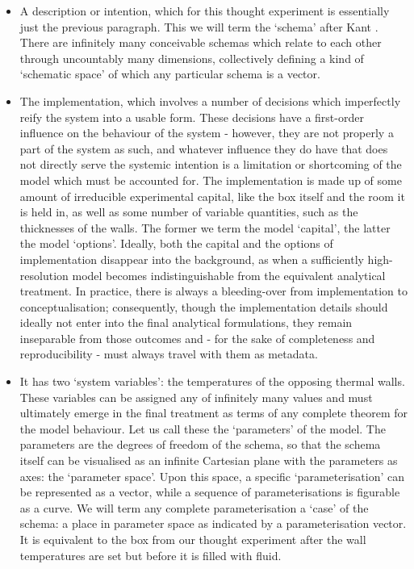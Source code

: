 \documentclass[a4paper,11pt,oneside]{book}
\begin{document}
\begin{itemize}
\item A description or intention, which for this thought experiment is essentially just the previous paragraph. This we will term the `schema' after Kant \cite{Kant1781-su}. There are infinitely many conceivable schemas which relate to each other through uncountably many dimensions, collectively defining a kind of `schematic space' of which any particular schema is a vector.


\item The implementation, which involves a number of decisions which imperfectly reify the system into a usable form. These decisions have a first-order influence on the behaviour of the system - however, they are not properly a part of the system as such, and whatever influence they do have that does not directly serve the systemic intention is a limitation or shortcoming of the model which must be accounted for. The implementation is made up of some amount of irreducible experimental capital, like the box itself and the room it is held in, as well as some number of variable quantities, such as the thicknesses of the walls. The former we term the model `capital', the latter the model `options'. Ideally, both the capital and the options of implementation disappear into the background, as when a sufficiently high-resolution model becomes indistinguishable from the equivalent analytical treatment. In practice, there is always a bleeding-over from implementation to conceptualisation; consequently, though the implementation details should ideally not enter into the final analytical formulations, they remain inseparable from those outcomes and - for the sake of completeness and reproducibility - must always travel with them as metadata.


\item It has two `system variables': the temperatures of the opposing thermal walls. These variables can be assigned any of infinitely many values and must ultimately emerge in the final treatment as terms of any complete theorem for the model behaviour. Let us call these the `parameters' of the model. The parameters are the degrees of freedom of the schema, so that the schema itself can be visualised as an infinite Cartesian plane with the parameters as axes: the `parameter space'. Upon this space, a specific `parameterisation' can be represented as a vector, while a sequence of parameterisations is figurable as a curve. We will term any complete parameterisation a `case' of the schema: a place in parameter space as indicated by a parameterisation vector. It is equivalent to the box from our thought experiment after the wall temperatures are set but before it is filled with fluid.



\end{itemize}
\end{document}
